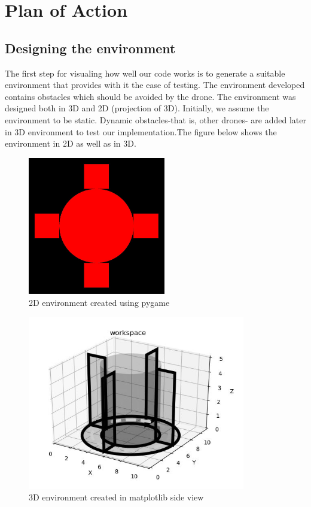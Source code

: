 \documentclass{IEEEtran}
\begin{document}
\section{\textbf{Plan of Action}}
\subsection{\textbf{Designing the environment}} 
The first step for visualing how well our code works is to generate a suitable environment that provides with it the ease of testing. 
The environment developed contains obstacles which should be avoided by the drone. The environment was designed both in 
3D and 2D (projection of 3D). Initially, we assume the environment to be static. Dynamic obstacles-that is, other drones- are added later in 3D environment to test our implementation.The figure below shows the environment in 2D as well as in 3D.
\begin{figure}[h]
    \centering
    \includegraphics[width=6cm]{2dpygame}
    \caption{2D environment created using pygame}
    \label{fig:2D environment created using pygame}
\end{figure}
\begin{figure}[h]
    \centering
    \includegraphics[width=9.5cm]{3dmatplotlib}
    \caption{3D environment created in matplotlib side view}
    \label{fig:3D environment created in matplotlib}
\end{figure}
\end{document}
